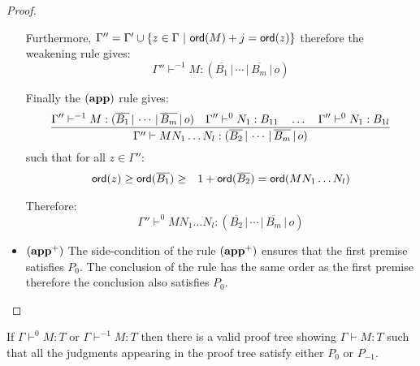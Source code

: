 \begin{proof}
\begin{itemize}
    Furthermore, $\Gamma'' = \Gamma' \union \{ z \in \Gamma \ | \ \ord{M} + j = \ord{z}\}$ therefore
    the weakening rule gives:
    $$\Gamma'' \vdash^{-1} M : (\overline{B_1} \, | \, \cdots \, | \, \overline{B_m} \, | \, o)$$

    Finally the $\mathbf{(app)}$ rule gives:
    $$\frac{\displaystyle \Gamma'' \vdash^{-1} M : (\overline{B_1} \, | \, \cdots \, | \, \overline{B_m} \, | \, o)
    \quad \Gamma'' \vdash^0 N_1 : B_{11} \quad \ldots \quad \Gamma'' \vdash^0 N_1 : B_{1l}
    }{ \Gamma'' \vdash M N_1 \ldots N_l : (\overline{B_2} \, | \, \cdots \, | \,
            \overline{B_m} \, | \, o)}
    $$
    such that for all $z\in \Gamma''$:
    \begin{eqnarray*}
    {\sf ord}(z) \geq {\sf ord}(\overline{B_1})
    &\geq& 1 + {\sf ord}(\overline{B_2}) = {\sf ord}(M N_1 \ldots N_l)
    \end{eqnarray*}

    Therefore:
    $$\Gamma'' \vdash^0 M N_1 \ldots N_l : (\overline{B_2} \, | \, \cdots \, | \,
            \overline{B_m} \, | \, o)$$

\item $\mathbf{(app^+)}$  The side-condition of the rule $\mathbf{(app^+)}$ ensures that the first premise
 satisfies $P_0$. The conclusion of the rule has the same order as the first premise
 therefore the conclusion also satisfies $P_0$.
\end{itemize}
\end{proof}


\begin{lem}
\label{lem:prooftree01only} If $\Gamma \vdash^{0} M : T$ or $\Gamma
\vdash^{-1} M : T$ then there is a valid proof tree showing $\Gamma
\vdash M : T$ such that all the judgments appearing in the proof
tree satisfy either $P_0$ or $P_{-1}$.
\end{lem}


